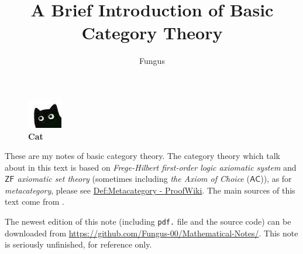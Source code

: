 \documentclass{article}
\title{A Brief Introduction of Basic Category Theory}	%
\author{Fungus}	%
\begin{document}
\maketitle
\renewcommand{\thefootnote}{\color{red}{*}}
\theoremstyle{definition}
\newtheorem{defi}{Definition}
\newtheorem{thm}{Theorem}
\newtheorem{lmm}{Lemma}
\newtheorem{exm}{Example}
\newtheorem{cor}{Corollary}
\newtheorem*{Mark}{Mark}

\newcommand\Ob{\mathrm{Ob}}
\newcommand\Mor{\mathrm{Mor}}
\newcommand\Hom{\mathrm{Hom}}
\newcommand\dom{\mathrm{dom}}
\newcommand\cod{\mathrm{cod}}
\newcommand\id{\mathrm{id}}
\newcommand\op{^\mathrm{op}}
\newcommand\zfc{\mathsf{ZFC}}
\newcommand\AC{\mathsf{AC}}
\newcommand\con{\mathrm{Con}}
\newcommand\tid{\mathbf{id}}
\newcommand\ca{\mathcal{C}}
\newcommand\D{\mathcal{D}}
\newcommand\1{\mathit{1}}
\newcommand\iv{^{-1}}
\newcommand\tto{\mathop{\to}\limits^{\sim}}
\newcommand\equ{\mathop{\Rightarrow}\limits^{\sim}}
\newcommand\ev{\mathrm{ev}}
\newcommand\fct{\mathrm{Fct}}

\nocite{alg-2}\nocite{cat-3}\nocite{cat-4}\nocite{cat-5}\nocite{cat-6-1}\nocite{cat-7}\nocite{cat-8}\nocite{cat-9}\nocite{cat-10}\nocite{cat-11}\nocite{Tex-1}

\begin{figure}[ht] %
	\centering
	\includegraphics{Cat.jpg}	%
	\caption*{\bf Cat}
	\label{Cat}
\end{figure}

These are my notes of basic category theory. The category theory which talk about in this text is based on \emph{Frege-Hilbert first-order logic axiomatic system} and \emph{$\mathsf{ZF}$ axiomatic set theory} (sometimes including \emph{the Axiom of Choice} ($\AC$)), as for \emph{metacategory}, please see \href{https://proofwiki.org/wiki/Definition:Metacategory}{Def:Metacategory - ProofWiki}. The main sources of this text come from \cite[第二章]{alg-1}.

The newest edition of this note (including \texttt{pdf.} file and the source code) can be downloaded from \url{https://github.com/Fungus-00/Mathematical-Notes/}. This note is seriously unfinished, for reference only.
\end{document}
